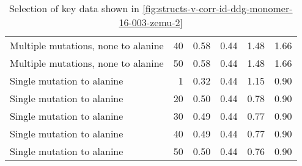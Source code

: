 \begin{table}
\begin{tabular}{lrrrrr}
 Multiple mutations, none to alanine &          40 &             0.58 &                    0.44 &               1.48 &                      1.66 \\
 Multiple mutations, none to alanine &          50 &             0.58 &                    0.44 &               1.48 &                      1.66 \\
          Single mutation to alanine &           1 &             0.32 &                    0.44 &               1.15 &                      0.90 \\
          Single mutation to alanine &          20 &             0.50 &                    0.44 &               0.78 &                      0.90 \\
          Single mutation to alanine &          30 &             0.49 &                    0.44 &               0.77 &                      0.90 \\
          Single mutation to alanine &          40 &             0.49 &                    0.44 &               0.77 &                      0.90 \\
          Single mutation to alanine &          50 &             0.50 &                    0.44 &               0.76 &                      0.90 \\
\bottomrule
\end{tabular}

\caption[]{Selection of key data shown in \cref{fig:structs-v-corr-id-ddg-monomer-16-003-zemu-2}}
\label{tab:structs-v-corr-id-ddg-monomer-16-003-zemu-2-underlying-data}
\end{table}
